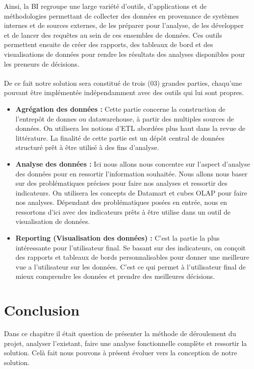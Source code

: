 Ainsi, la BI regroupe une large variété d’outils, d’applications et de méthodologies permettant de collecter des données en provenance de systèmes internes et de sources externes, de les préparer pour l’analyse, de les développer et de lancer des requêtes au sein de ces ensembles de données. Ces outils permettent ensuite de créer des rapports, des tableaux de bord et des visualisations de données pour rendre les résultats des analyses disponibles pour les preneurs de décisions.
\paragraph{}

De ce fait notre solution sera constitué de trois (03) grandes parties, chaqu’une pouvant être implémentée indépendamment avec des outils qui lui sont propres.  
\begin{itemize}
    \item \textbf{Agrégation des données :} Cette partie concerne la construction de l’entrepôt de donnes ou datawarehouse, à partir des multiples sources de données. On utilisera les notions d’ETL abordées plus haut dans la revue de littérature. La finalité de cette partie est un dépôt central de données structuré prêt à être utilisé à des fins d’analyse.
    \item \textbf{Analyse des données :}  Ici nous allons nous concentre sur l’aspect d’analyse des données pour en ressortir l’information souhaitée. Nous allons nous baser sur des problématiques précises pour faire nos analyses et ressortir des indicateurs. On utilisera les concepts de Datamart et cubes OLAP pour faire nos analyses. Dépendant des problématiques posées en entrée, nous en ressortons d’ici avec des indicateurs prêts à être utilise dans un outil de visualisation de données.
    \item \textbf{Reporting (Visualisation des données) :} C’est la partie la plus intéressante pour l’utilisateur final. Se basant sur des indicateurs, on conçoit des rapports et tableaux de bords personnalisables pour donner une meilleure vue a l’utilisateur sur les données. C’est ce qui permet à l’utilisateur final de mieux comprendre les données et prendre des meilleures décisions.
\end{itemize}

\section*{Conclusion}%
%
Dans ce chapitre il était question de présenter la méthode de déroulement du projet, analyser l'existant, faire une analyse fonctionnelle complète et ressortir la solution. Celà fait nous pouvons à présent évoluer vers la conception de notre solution.  
